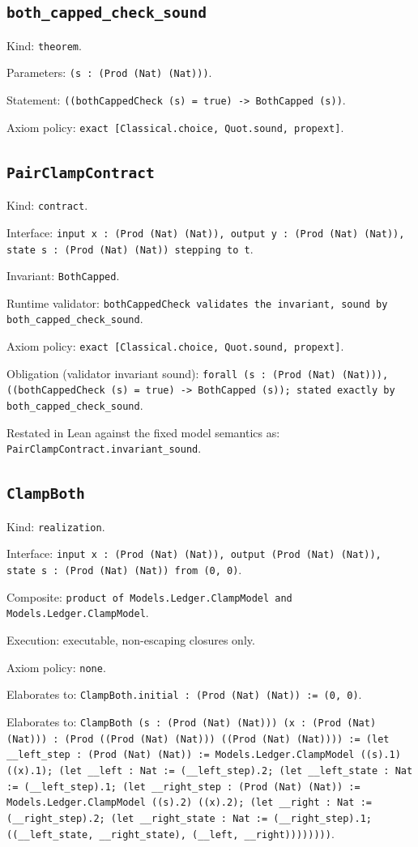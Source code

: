 \documentclass[11pt]{article}
\begin{document}
\subsection*{\texttt{both\_capped\_check\_sound}}
\noindent Kind: \texttt{theorem}.\par
\noindent Parameters: \texttt{(s : (Prod (Nat) (Nat)))}.\par
\noindent Statement: \texttt{((bothCappedCheck (s) = true) -> BothCapped (s))}.\par
\noindent Axiom policy: \texttt{exact [Classical.choice, Quot.sound, propext]}.\par
\subsection*{\texttt{PairClampContract}}
\noindent Kind: \texttt{contract}.\par
\noindent Interface: \texttt{input x : (Prod (Nat) (Nat)), output y : (Prod (Nat) (Nat)), state s : (Prod (Nat) (Nat)) stepping to t}.\par
\noindent Invariant: \texttt{BothCapped}.\par
\noindent Runtime validator: \texttt{bothCappedCheck validates the invariant, sound by both\_capped\_check\_sound}.\par
\noindent Axiom policy: \texttt{exact [Classical.choice, Quot.sound, propext]}.\par
\noindent Obligation (validator invariant sound): \texttt{forall (s : (Prod (Nat) (Nat))), ((bothCappedCheck (s) = true) -> BothCapped (s)); stated exactly by both\_capped\_check\_sound}.\par
\noindent Restated in Lean against the fixed model semantics as: \texttt{PairClampContract.invariant\_sound}.\par
\subsection*{\texttt{ClampBoth}}
\noindent Kind: \texttt{realization}.\par
\noindent Interface: \texttt{input x : (Prod (Nat) (Nat)), output (Prod (Nat) (Nat)), state s : (Prod (Nat) (Nat)) from (0, 0)}.\par
\noindent Composite: \texttt{product of Models.Ledger.ClampModel and Models.Ledger.ClampModel}.\par
\noindent Execution: executable, non-escaping closures only.\par
\noindent Axiom policy: \texttt{none}.\par
\noindent Elaborates to: \texttt{ClampBoth.initial : (Prod (Nat) (Nat)) := (0, 0)}.\par
\noindent Elaborates to: \texttt{ClampBoth (s : (Prod (Nat) (Nat))) (x : (Prod (Nat) (Nat))) : (Prod ((Prod (Nat) (Nat))) ((Prod (Nat) (Nat)))) := (let \_\_left\_step : (Prod (Nat) (Nat)) := Models.Ledger.ClampModel ((s).1) ((x).1); (let \_\_left : Nat := (\_\_left\_step).2; (let \_\_left\_state : Nat := (\_\_left\_step).1; (let \_\_right\_step : (Prod (Nat) (Nat)) := Models.Ledger.ClampModel ((s).2) ((x).2); (let \_\_right : Nat := (\_\_right\_step).2; (let \_\_right\_state : Nat := (\_\_right\_step).1; ((\_\_left\_state, \_\_right\_state), (\_\_left, \_\_right))))))))}.\par
\end{document}
